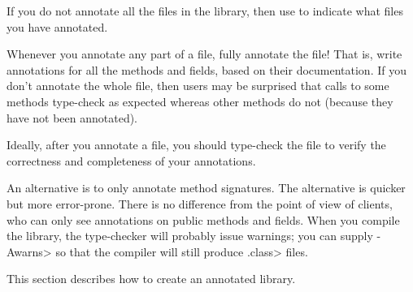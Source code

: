 
If you do not annotate all the files in the library, then use
 to indicate what files you have
annotated.

Whenever you annotate any part of a file, fully annotate the file!  That
is, write annotations for all the methods and fields, based on their
documentation.  If you don't annotate the whole file, then users may be
surprised that calls to some methods type-check as expected whereas other
methods do not (because they have not been annotated).



Ideally, after you annotate a file, you should type-check the file to verify
the correctness and completeness of your annotations.

An alternative is to
only annotate method signatures.  The alternative is quicker but more
error-prone.  There is no difference from the point of view of clients,
who can only see annotations on public methods and fields.  When you
compile the library, the type-checker will probably issue warnings; you can
supply \<-Awarns> so that the
compiler will still produce \<.class> files.



This section describes how to create an annotated library.

